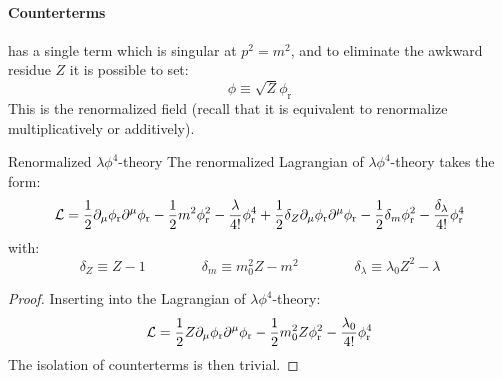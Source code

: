 \paragraph{Counterterms}

 has a single term which is singular at $ p^2 = m^2 $, and to eliminate the awkward residue $ Z $ it is possible to set:
\begin{equation}
  \phi \equiv \sqrt{Z} \phi_\text{r}
  \label{eq:phi-ren}
\end{equation}
This is the renormalized field (recall that it is equivalent to renormalize multiplicatively or additively).

\begin{proposition}{Renormalized $ \lambda \phi^4 $-theory}{}
  The renormalized Lagrangian of $ \lambda \phi^4 $-theory takes the form:
  \begin{equation}
    \mathcal{L} = \frac{1}{2} \partial_\mu \phi_\text{r} \partial^\mu \phi_\text{r} - \frac{1}{2} m^2 \phi_\text{r}^2 - \frac{\lambda}{4!} \phi_\text{r}^4 + \frac{1}{2} \delta_Z \partial_\mu \phi_\text{r} \partial^\mu \phi_\text{r} - \frac{1}{2} \delta_m \phi_\text{r}^2 - \frac{\delta_\lambda}{4!} \phi_\text{r}^4
  \end{equation}
  with:
  \begin{equation}
    \delta_Z \equiv Z - 1
    \qquad \qquad
    \delta_m \equiv m_0^2 Z - m^2
    \qquad \qquad
    \delta_\lambda \equiv \lambda_0 Z^2 - \lambda
  \end{equation}
\end{proposition}

\begin{proofbox}
  \begin{proof}
    Inserting  into the Lagrangian of $ \lambda \phi^4 $-theory:
    \begin{equation*}
      \mathcal{L} = \frac{1}{2} Z \partial_\mu \phi_\text{r} \partial^\mu \phi_\text{r} - \frac{1}{2} m_0^2 Z \phi_\text{r}^2 - \frac{\lambda_0}{4!} \phi_\text{r}^4
    \end{equation*}
    The isolation of counterterms is then trivial.
  \end{proof}
\end{proofbox}

